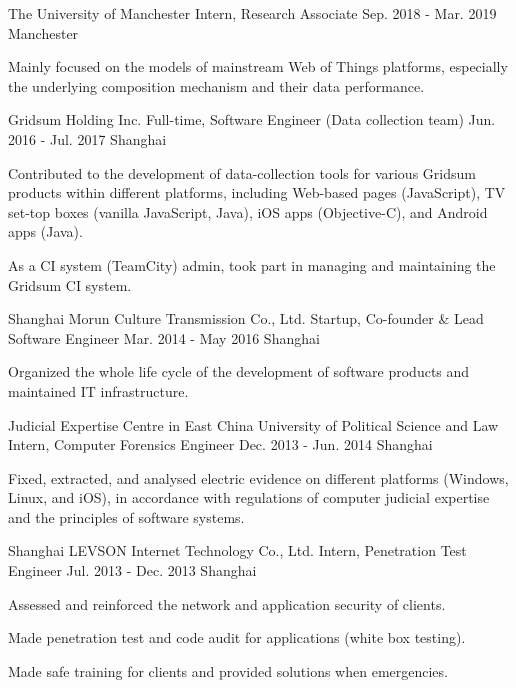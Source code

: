 \begin{cventries}
	  \cventry
	{The University of Manchester}
	{Intern, Research Associate}
	{Sep. 2018 - Mar. 2019}
	{Manchester}
	{
		\begin{cvitems}
			\item {Mainly focused on the models of mainstream Web of Things platforms, especially the underlying composition mechanism and their data performance.}
		\end{cvitems}
	}

  \cventry
    {Gridsum Holding Inc.}
    {Full-time, Software Engineer (Data collection team)}
    {Jun. 2016 - Jul. 2017}
    {Shanghai}
    {
      \begin{cvitems}
        \item {Contributed to the development of data-collection tools for various Gridsum products within different platforms, including Web-based pages (JavaScript), TV set-top boxes (vanilla JavaScript, Java), iOS apps (Objective-C), and Android apps (Java).}
        \item {As a CI system (TeamCity) admin, took part in managing and maintaining the Gridsum CI system.}
      \end{cvitems}
    }
    
  \cventry
    {Shanghai Morun Culture Transmission Co., Ltd.}
    {Startup, Co-founder \& Lead Software Engineer}
    {Mar. 2014 - May 2016}
    {Shanghai}
    {
      \begin{cvitems}
        \item {Organized the whole life cycle of the development of software products and maintained IT infrastructure.}
      \end{cvitems}
    }
    
  \cventry
    {Judicial Expertise Centre in East China University of Political Science and Law}
    {Intern, Computer Forensics Engineer}
    {Dec. 2013 - Jun. 2014}
    {Shanghai}
    {
      \begin{cvitems}
        \item {Fixed, extracted, and analysed electric evidence on different platforms (Windows, Linux, and iOS), in accordance with regulations of computer judicial expertise and the principles of software systems.}
      \end{cvitems} 
    }
    
  \cventry
    {Shanghai LEVSON Internet Technology Co., Ltd.}
    {Intern, Penetration Test Engineer}
    {Jul. 2013 - Dec. 2013}
    {Shanghai}
    {
      \begin{cvitems}
        \item {Assessed and reinforced the network and application security of clients.}
        \item {Made penetration test and code audit for applications (white box testing).}
        \item {Made safe training for clients and provided solutions when emergencies.}
      \end{cvitems}
    }

\end{cventries}
